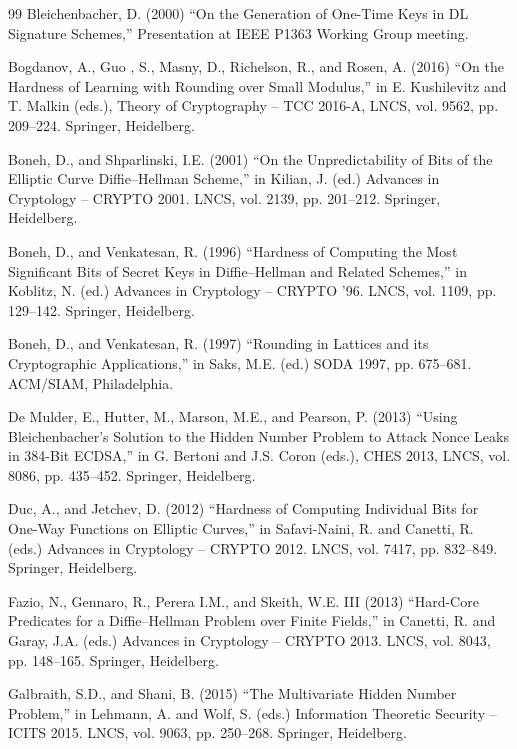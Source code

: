 \documentclass[11pt]{article}
\theoremstyle{definition}
\begin{document}
\begin{thebibliography}{99}
    {Bleichenbacher, D. (2000)
        ``On the Generation of One-Time Keys in DL Signature Schemes,'' Presentation at IEEE P1363 Working Group meeting.}

    {Bogdanov, A., Guo , S., Masny, D., Richelson, R., and Rosen, A. (2016)
        ``On the Hardness of Learning with Rounding over Small Modulus,'' in E. Kushilevitz and T. Malkin (eds.), Theory of Cryptography -- TCC 2016-A, LNCS, vol. 9562, pp. 209--224. Springer, Heidelberg.}

    {Boneh, D., and Shparlinski, I.E. (2001)
        ``On the Unpredictability of Bits of the Elliptic Curve Diffie--Hellman Scheme,'' in Kilian, J. (ed.) Advances in Cryptology -- CRYPTO 2001. LNCS, vol. 2139, pp. 201--212. Springer, Heidelberg.}

    {Boneh, D., and Venkatesan, R. (1996)
        ``Hardness of Computing the Most Significant Bits of Secret Keys in Diffie--Hellman and Related Schemes,'' in Koblitz, N. (ed.) Advances in Cryptology -- CRYPTO '96. LNCS, vol. 1109, pp. 129--142. Springer, Heidelberg.}

    {Boneh, D., and Venkatesan, R. (1997)
        ``Rounding in Lattices and its Cryptographic Applications,'' in Saks, M.E. (ed.) SODA 1997, pp. 675--681. ACM/SIAM, Philadelphia.}

    {De Mulder, E., Hutter, M., Marson, M.E., and Pearson, P. (2013)
        ``Using Bleichenbacher's Solution to the Hidden Number Problem to Attack Nonce Leaks in 384-Bit ECDSA,'' in G. Bertoni and J.S. Coron  (eds.), CHES 2013, LNCS, vol. 8086, pp. 435--452. Springer, Heidelberg.}

    {Duc, A., and Jetchev, D. (2012)
        ``Hardness of Computing Individual Bits for One-Way Functions on Elliptic Curves,'' in Safavi-Naini, R. and Canetti, R. (eds.) Advances in Cryptology -- CRYPTO 2012. LNCS, vol. 7417, pp. 832--849. Springer, Heidelberg.}

    {Fazio, N., Gennaro, R., Perera I.M., and Skeith, W.E. III (2013)
        ``Hard-Core Predicates for a Diffie--Hellman Problem over Finite Fields,'' in Canetti, R. and Garay, J.A. (eds.) Advances in Cryptology -- CRYPTO 2013. LNCS, vol. 8043, pp. 148--165. Springer, Heidelberg.}

    {Galbraith, S.D., and Shani, B. (2015)
        ``The Multivariate Hidden Number Problem,'' in Lehmann, A. and Wolf, S. (eds.) Information Theoretic Security -- ICITS 2015. LNCS, vol. 9063, pp. 250--268. Springer, Heidelberg.}


\end{thebibliography}
\end{document}
